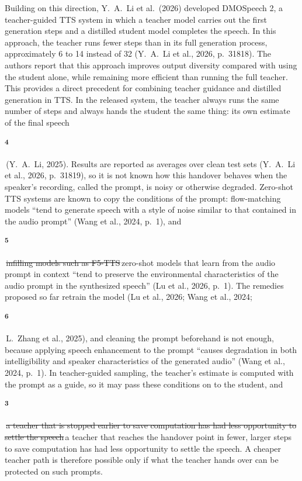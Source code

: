\documentclass[11pt,a4paper]{article}
\newcommand{\chg}[2]{{\color{delcol}\sout{#1}}\,{\color{addcol}#2}}
\newcommand{\flag}[2]{\colorbox{flagcol}{\strut\textsuperscript{\bfseries #1}}\,{#2}}
\begin{document}
Building on this direction, Y.\ A.\ Li et al.\ (2026) developed DMOSpeech 2, a teacher-guided TTS system in which a teacher model carries out the first generation steps and a distilled student model completes the speech. In this approach, the teacher runs fewer steps than in its full generation process, approximately 6 to 14 instead of 32 (Y.\ A.\ Li et al., 2026, p.~31818). The authors report that this approach improves output diversity compared with using the student alone, while remaining more efficient than running the full teacher. This provides a direct precedent for combining teacher guidance and distilled generation in TTS. In the released system, the teacher always runs the same number of steps and always hands the student the same thing: its own estimate of the final speech \flag{4}{(Y.\ A.\ Li, 2025)}. Results are reported as averages over clean test sets (Y.\ A.\ Li et al., 2026, p.~31819), so it is not known how this handover behaves when the speaker's recording, called the prompt, is noisy or otherwise degraded. Zero-shot TTS systems are known to copy the conditions of the prompt: flow-matching models ``tend to generate speech with a style of noise similar to that contained in the audio prompt'' (Wang et al., 2024, p.~1), and \flag{5}{\chg{infilling models such as F5-TTS}{zero-shot models that learn from the audio prompt in context}} ``tend to preserve the environmental characteristics of the audio prompt in the synthesized speech'' (Lu et al., 2026, p.~1). The remedies proposed so far retrain the model (Lu et al., 2026; Wang et al., 2024; \flag{6}{L.\ Zhang et al., 2025}), and cleaning the prompt beforehand is not enough, because applying speech enhancement to the prompt ``causes degradation in both intelligibility and speaker characteristics of the generated audio'' (Wang et al., 2024, p.~1). In teacher-guided sampling, the teacher's estimate is computed with the prompt as a guide, so it may pass these conditions on to the student, and \flag{3}{\chg{a teacher that is stopped earlier to save computation has had less opportunity to settle the speech}{a teacher that reaches the handover point in fewer, larger steps to save computation has had less opportunity to settle the speech}}. A cheaper teacher path is therefore possible only if what the teacher hands over can be protected on such prompts.
\end{document}
